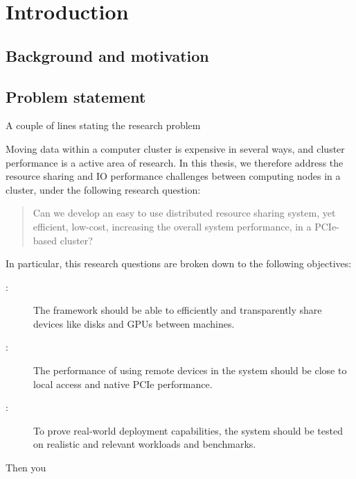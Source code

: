 \chapter{Introduction}\label{sec:intro}
\section{Background and motivation}

\section{Problem statement}\label{sec:objectives}
A couple of lines stating the research problem

Moving data within a computer cluster is expensive in several ways, and cluster performance is a active area of research. In this thesis, we therefore address the resource sharing and IO performance challenges between computing nodes in a cluster, under the following research question: 
\begin{quote}
    Can we develop an easy to use distributed resource sharing system, yet efficient, low-cost, increasing the overall system performance, in a PCIe-based cluster?
\end{quote}
In particular, this research questions are broken down to the following objectives:
\begin{description}
	\item[:] The framework should be able to efficiently and transparently share devices like disks and GPUs between machines.
	\item[:] The performance of using remote devices in the system should be close to local access and native PCIe performance.
	\item[:] To prove real-world deployment capabilities, the system should be tested on realistic and relevant workloads and benchmarks.
	
\end{description}

Then you 

%	

